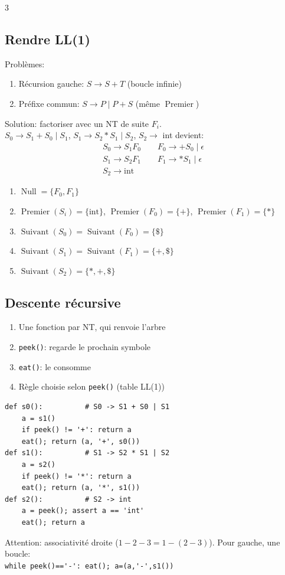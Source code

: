 \documentclass[12pt, a4paper]{article}
\newcommand{\Null}{\operatorname{Null}}
\newcommand{\Prem}{\operatorname{Premier}}
\newcommand{\Suiv}{\operatorname{Suivant}}
\begin{document}
\begin{multicols*}{3}
	\subsection{Rendre LL(1)}
	Problèmes:
	\begin{enumerate}[\roman*.]
		\item Récursion gauche: $S\rightarrow S+T$ (boucle infinie)
		\item Préfixe commun: $S\rightarrow P\mid P+S$ (même $\Prem$)
	\end{enumerate}
	Solution: factoriser avec un NT de suite $F_i$.\\
	$S_0\rightarrow S_1+S_0\mid S_1$, $S_1\rightarrow S_2*S_1\mid S_2$, $S_2\rightarrow$ int devient:
	\begin{gather*}
		S_0 \rightarrow S_1F_0 \qquad F_0 \rightarrow +S_0 \mid \epsilon\\
		S_1 \rightarrow S_2F_1 \qquad F_1 \rightarrow *S_1 \mid \epsilon\\
		S_2 \rightarrow \text{int}
	\end{gather*}
	\begin{enumerate}[\roman*.]
		\item $\Null=\{F_0,F_1\}$
		\item $\Prem(S_i)=\{\text{int}\}$, $\Prem(F_0)=\{+\}$, $\Prem(F_1)=\{*\}$
		\item $\Suiv(S_0)=\Suiv(F_0)=\{\$\}$
		\item $\Suiv(S_1)=\Suiv(F_1)=\{+,\$\}$
		\item $\Suiv(S_2)=\{*,+,\$\}$
	\end{enumerate}
 
	\subsection{Descente récursive}
	\begin{enumerate}[\roman*.]
		\item Une fonction par NT, qui renvoie l'arbre
		\item \lstinline|peek()|: regarde le prochain symbole
		\item \lstinline|eat()|: le consomme
		\item Règle choisie selon \lstinline|peek()| (table LL(1))
	\end{enumerate}
	\noindent\begin{minipage}{\linewidth}
		\begin{lstlisting}[style=pseudo]
def s0():          # S0 -> S1 + S0 | S1
    a = s1()
    if peek() != '+': return a
    eat(); return (a, '+', s0())
def s1():          # S1 -> S2 * S1 | S2
    a = s2()
    if peek() != '*': return a
    eat(); return (a, '*', s1())
def s2():          # S2 -> int
    a = peek(); assert a == 'int'
    eat(); return a
\end{lstlisting}
	\end{minipage}
	Attention: associativité droite ($1-2-3=1-(2-3)$). Pour gauche, une boucle:\\\lstinline|while peek()=='-': eat(); a=(a,'-',s1())|
	\colbreak


\end{multicols*}
\end{document}
